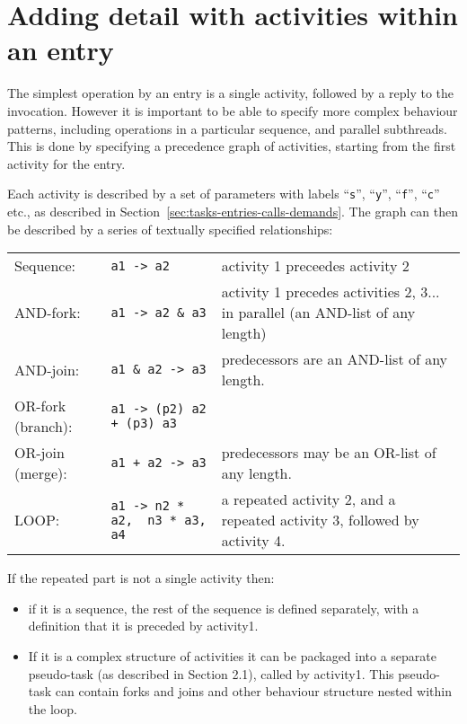 \documentclass[11pt]{article}
\makeatletter
\newcommand{\parameter}[1]{\texttt{#1}\index{#1@\texttt{#1}}}
\makeatother
\begin{document}
\section{Adding detail with activities within an entry}
\label{sec:activities}
\label{sec:6}

The simplest operation by an entry is a single activity, followed by a reply to the invocation.
However it is important to be able to specify more complex behaviour patterns, including 
operations in a particular sequence, and parallel subthreads. This is done by specifying a precedence 
graph of activities, starting from the first activity for the entry.

Each activity is described by a set of parameters with labels ``\parameter{s}'', ``\parameter{y}'', ``\parameter{f}'', ``\parameter{c}'' etc., as described in
Section~\ref{sec:tasks-entries-calls-demands}. The graph can then be described by a series of textually specified relationships: 

\begin{tabular}{lp{2.5in}p{2in}}
\hline
Sequence\index{sequence}\index{->@\texttt{->}}: & \verb!a1 -> a2! & activity 1 preceedes activity 2 \\
AND-fork\index{fork!AND}\index{AND-fork}\index{->@\texttt{\&}}: & \verb!a1 -> a2 & a3! &  activity 1 precedes activities 2, 3...
in parallel (an AND-list of any length) \\
AND-join\index{join!AND}\index{AND-join}: & \verb!a1 & a2 -> a3! &  predecessors are an AND-list of any length. \\
OR-fork (branch)\index{fork!OR}\index{OR-fork}\index{branch}\index{->@\texttt{+}}: & \verb!a1 -> (p2) a2 + (p3) a3! & \\ 
OR-join (merge):\index{join!OR}\index{OR-join}\index{merge} & \verb!a1 + a2 -> a3! & predecessors may be an OR-list of any length. \\ 
LOOP\index{LOOP}\index{->@\texttt{*}}: & \verb!a1 -> n2 * a2,  n3 * a3, a4! & a repeated activity 2, and a repeated activity 3,
followed by activity 4.\\ 
\hline
\end{tabular}

If the repeated part is not a single activity then:
\begin{itemize}
\item if it is a sequence, the rest of the sequence is defined separately, with a definition that it is
  preceded by activity1.
\item If it is a complex structure of activities it can be packaged into a separate pseudo-task (as
  described in Section 2.1), called by activity1. This pseudo-task can contain forks and joins and
  other behaviour structure nested within the loop.
\end{itemize}
\end{document}
